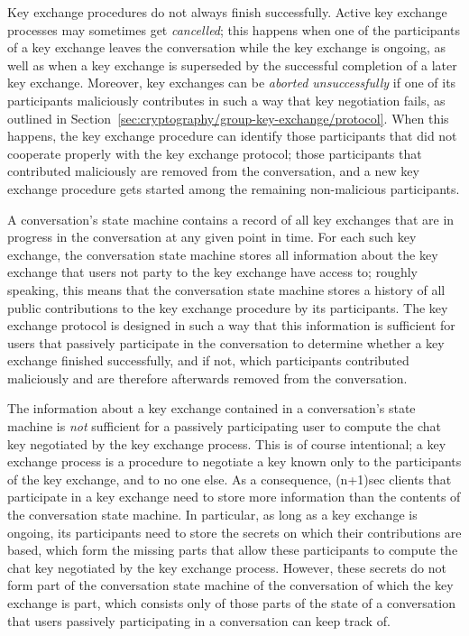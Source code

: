 \documentclass{article}
\begin{document}
Key exchange procedures do not always finish successfully.
Active key exchange processes may sometimes get \emph{cancelled}; this happens when one of the participants of a key exchange leaves the conversation while the key exchange is ongoing, as well as when a key exchange is superseded by the successful completion of a later key exchange.
Moreover, key exchanges can be \emph{aborted unsuccessfully} if one of its participants maliciously contributes in such a way that key negotiation fails, as outlined in Section~\ref{sec:cryptography/group-key-exchange/protocol}.
When this happens, the key exchange procedure can identify those participants that did not cooperate properly with the key exchange protocol; those participants that contributed maliciously are removed from the conversation, and a new key exchange procedure gets started among the remaining non-malicious participants.


A conversation's state machine contains a record of all key exchanges that are in progress in the conversation at any given point in time.
For each such key exchange, the conversation state machine stores all information about the key exchange that users not party to the key exchange have access to; roughly speaking, this means that the conversation state machine stores a history of all public contributions to the key exchange procedure by its participants.
The key exchange protocol is designed in such a way that this information is sufficient for users that passively participate in the conversation to determine whether a key exchange finished successfully, and if not, which participants contributed maliciously and are therefore afterwards removed from the conversation.

The information about a key exchange contained in a conversation's state machine is \emph{not} sufficient for a passively participating user to compute the chat key negotiated by the key exchange process.
This is of course intentional; a key exchange process is a procedure to negotiate a key known only to the participants of the key exchange, and to no one else.
As a consequence, (n+1)sec clients that participate in a key exchange need to store more information than the contents of the conversation state machine.
In particular, as long as a key exchange is ongoing, its participants need to store the secrets on which their contributions are based, which form the missing parts that allow these participants to compute the chat key negotiated by the key exchange process.
However, these secrets do not form part of the conversation state machine of the conversation of which the key exchange is part, which consists only of those parts of the state of a conversation that users passively participating in a conversation can keep track of.
\end{document}
